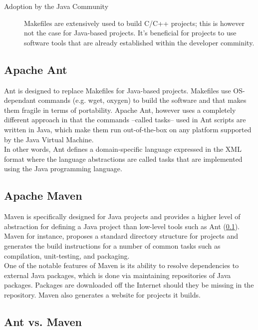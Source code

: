 \begin{description}
\item[Adoption by the Java Community] 
Makefiles are extensively used to build C/C++ projects; this is however
not the case for Java-based projects. It's beneficial for projects
to use software tools that are already established within the
developer comminity.
\end{description}

\subsection{Apache Ant}\label{BuildSystemToolsAnt}
Ant is designed to replace Makefiles for Java-based projects. Makefiles use
OS-dependant commands (e.g. wget, oxygen) to build the software and that
makes them fragile in terms of portability. Apache Ant, however uses
a completely different approach in that the commands --called tasks--
used in Ant scripts are written in Java, which make them run out-of-the-box
on any platform supported by the Java Virtual Machine.\\

In other words, Ant defines a domain-specific language expressed in the
XML format where the language abstractions are called tasks that are 
implemented using the Java programming language.

\subsection{Apache Maven}\label{BuildSystemToolsMaven}
Maven is specifically designed for Java projects and provides a higher
level of abstraction for defining a Java project than low-level tools
such as Ant (\ref{BuildSystemToolsAnt}). 
Maven for instance, proposes a standard directory structure
for projects and generates the build instructions for a number of 
common tasks such as compilation, unit-testing, and packaging.\\

One of the notable features of Maven is its ability to resolve
dependencies to external Java packages, which is done via
maintaining repositories of Java packages. Packages are downloaded
off the Internet should they be missing in the repository. Maven 
also generates a website for projects it builds.

\subsection{Ant vs. Maven}\label{BuildSystemToolsAntVSMaven}

